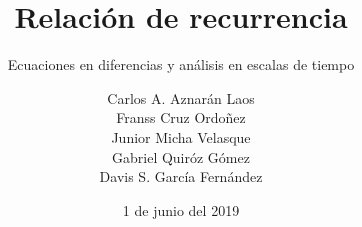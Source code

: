 \documentclass[graybox,envcountchap,sectrefs]{svmono}
\date{1 de junio del 2019}
\begin{document}
\author{Carlos A. Aznarán Laos\\
Franss Cruz Ordoñez\\
Junior Micha Velasque\\
Gabriel Quiróz Gómez\\
Davis S. García Fernández}
\title{Relación de recurrencia}
\subtitle{Ecuaciones en diferencias y análisis en escalas de tiempo}
\maketitle

\frontmatter





\tableofcontents



\mainmatter


%






%
%


\backmatter%

%

\printindex

\end{document}
